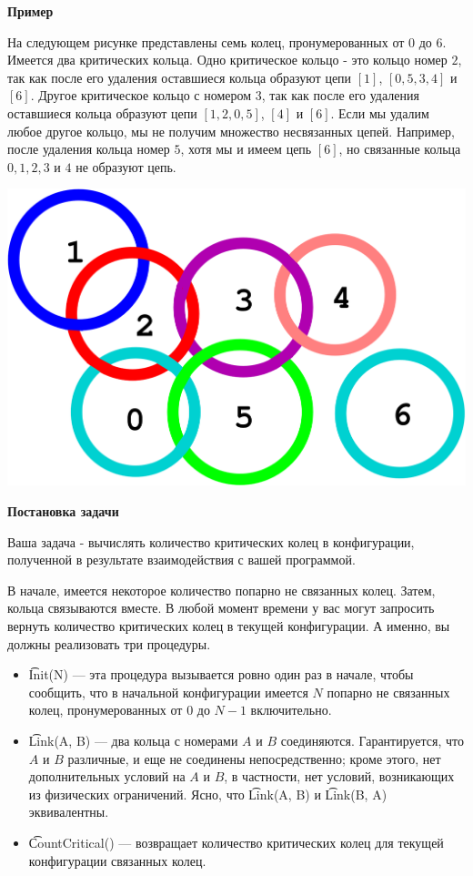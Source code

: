 \bf{Пример}

На следующем рисунке представлены семь колец, пронумерованных от $0$ до $6$. Имеется два критических кольца. Одно критическое кольцо - это кольцо номер $2$, так как после его удаления оставшиеся кольца образуют цепи $[1]$, $[0, 5, 3, 4]$ и $[6]$. Другое критическое кольцо с номером $3$, так как после его удаления оставшиеся кольца образуют цепи $[1, 2, 0, 5]$, $[4]$ и $[6]$. Если мы удалим любое другое кольцо, мы не получим множество несвязанных цепей. Например, после удаления кольца номер $5$, хотя мы и имеем цепь $[6]$, но связанные кольца $0, 1, 2, 3$ и $4$ не образуют цепь.

\includegraphics{image_001.png}

\bf{Постановка задачи}

Ваша задача - вычислять количество критических колец в конфигурации, полученной в результате взаимодействия с вашей программой.

В начале, имеется некоторое количество попарно не связанных колец. Затем, кольца связываются вместе. В любой момент времени у вас могут запросить вернуть количество критических колец в текущей конфигурации. А именно, вы должны реализовать три процедуры.

\begin{itemize}
\item \t{Init(N)} --- эта процедура вызывается ровно один раз в начале, чтобы сообщить, что в начальной конфигурации имеется $N$ попарно не связанных колец, пронумерованных от $0$ до $N - 1$ включительно.
\item \t{Link(A, B)} --- два кольца с номерами $A$ и $B$ соединяются. Гарантируется, что $A$ и $B$ различные, и еще не соединены непосредственно; кроме этого, нет дополнительных условий на $A$ и $B$, в частности, нет условий, возникающих из физических ограничений. Ясно, что \t{Link(A, B)} и \t{Link(B, A)} эквивалентны.
\item \t{CountCritical()} --- возвращает количество критических колец для текущей конфигурации связанных колец.
\end{itemize}

